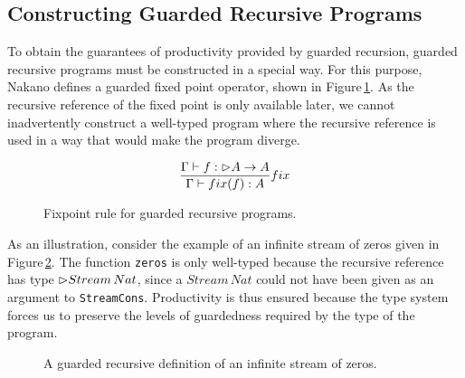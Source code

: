 
\subsection{Constructing Guarded Recursive Programs}
\label{sec:constr-guard-recurs}
To obtain the guarantees of productivity provided by guarded recursion, guarded
recursive programs must be constructed in a special way. For this purpose,
Nakano defines a guarded fixed point operator, shown in
Figure\,\ref{fig:guarded_recursion_fixpoint}. As the recursive reference of the
fixed point is only available later, we cannot inadvertently construct a well-typed program where the recursive reference is used in a way that would make the program diverge.
\begin{figure}
\[
\frac { \Gamma \vdash f : \rhd A \rightarrow A }{ \Gamma \vdash fix(f) : A } fix
\]
\caption{Fixpoint rule for guarded recursive programs.}
\label{fig:guarded_recursion_fixpoint}
\end{figure} 
As an illustration, consider the example of an infinite stream of zeros given in Figure\,\ref{fig:guarded_recursion_zeros}. The function \texttt{zeros} is only well-typed because the recursive reference has type $\rhd Stream\,Nat$, since a $Stream\,Nat$ could not have been given as an argument to \texttt{StreamCons}. Productivity is thus ensured because the type system forces us to preserve the levels of guardedness required by the type of the program.
\begin{figure}

\caption{A guarded recursive definition of an infinite stream of zeros.}
\label{fig:guarded_recursion_zeros}
\end{figure}

